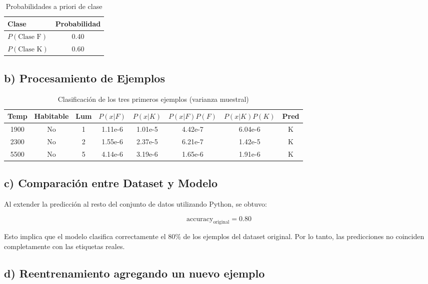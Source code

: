 \documentclass[11pt,a4paper]{article}
\begin{document}
\begin{table}[h]
\centering
\begin{tabular}{|l|c|}
\hline
\textbf{Clase} & \textbf{Probabilidad} \\
\hline
$P(\text{Clase F})$ & 0.40 \\
$P(\text{Clase K})$ & 0.60 \\
\hline
\end{tabular}
\caption{Probabilidades a priori de clase}
\end{table}

\newpage

\subsection*{b) Procesamiento de Ejemplos}

\begin{table}[h]
\centering
\begin{tabular}{|c|c|c|c|c|c|c|c|}
\hline
Temp & Habitable & Lum & $P(x|F)$ & $P(x|K)$ & $P(x|F)P(F)$ & $P(x|K)P(K)$ & Pred \\
\hline
1900 & No & 1 & 1.11e-6 & 1.01e-5 & 4.42e-7 & 6.04e-6 & K \\
2300 & No & 2 & 1.55e-6 & 2.37e-5 & 6.21e-7 & 1.42e-5 & K \\
5500 & No & 5 & 4.14e-6 & 3.19e-6 & 1.65e-6 & 1.91e-6 & K \\
\hline
\end{tabular}
\caption{Clasificación de los tres primeros ejemplos (varianza muestral)}
\end{table}

\subsection*{c) Comparación entre Dataset y Modelo}

Al extender la predicción al resto del conjunto de datos utilizando Python, se obtuvo:

\[
\text{accuracy}_{\text{original}} = 0.80
\]

Esto implica que el modelo clasifica correctamente el 80\% de los ejemplos del dataset original. Por lo tanto, las predicciones no coinciden completamente con las etiquetas reales.

\subsection*{d) Reentrenamiento agregando un nuevo ejemplo}
\end{document}
